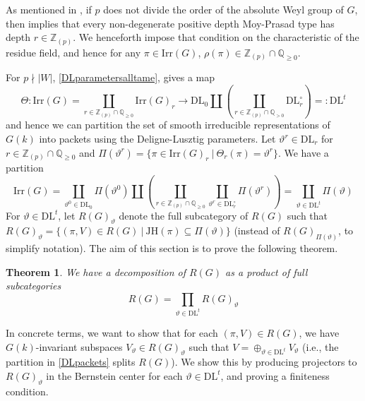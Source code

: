 \documentclass[11 pt]{article}
\numberwithin{equation}{subsection}
\newtheorem{theorem}{Theorem}[section]
\theoremstyle{definition}
\theoremstyle{remark}
\theoremstyle{conjecture}
\newcommand{\Irr}{\mathrm{Irr}}
\newcommand{\DL}{\mathrm{DL}}
\newcommand{\JH}{\mathrm{JH}}
\newcommand{\Z}{\mathbb Z}
\newcommand{\Q}{\mathbb Q}
\begin{document}
As mentioned in \cite[Remark 30]{chendebackertsai}, if $p$ does not divide the order of the absolute Weyl group of $G$, then \cite[Theorem 6.1]{fintzen2021types} implies that every non-degenerate positive depth Moy-Prasad type has depth $r \in \Z_{(p)}$. We henceforth impose that condition on the characteristic of the residue field, and hence for any $\pi \in \Irr(G)$, $\rho(\pi)\in \Z_{(p)}\cap \Q_{\geq 0}$. \par
For $p \nmid |W|$, \eqref{DLparametersalltame}, gives a map 
\begin{equation}\label{DL^tdefinition}
  \Theta:\Irr(G)=\coprod_{r \in \Z_{(p)}\cap \Q_{\geq 0}} \Irr(G)_r \longrightarrow \DL_0\coprod \left(\coprod_{r \in \Z_{(p)}\cap \Q_{> 0}}\mathrm{DL}_r^\circ\right)  =:\DL^t
\end{equation}
and hence we can partition the set of smooth irreducible representations of $G(k)$ into packets using the Deligne-Lusztig parameters. Let $\vartheta^r \in \DL_r$ for $ r \in \Z_{(p)}\cap \Q_{\geq 0}$ and $\Pi(\vartheta^r)= \{\pi \in \Irr(G)_r\:|\: \Theta_r(\pi)= \vartheta^r\}$. We have a partition  
\begin{equation}\label{DLpackets}
    \Irr(G) =\coprod_{\vartheta^0\in \DL_0}\Pi(\vartheta^0)\coprod \left( \coprod_{r \in \Z_{(p)}\cap \Q_{\geq 0} } \coprod_{\vartheta^r\in \DL^\circ_r} \Pi(\vartheta^r)\right)= \coprod_{\vartheta \in \DL^t}\Pi(\vartheta)
\end{equation}
For $\vartheta \in \DL^t$, let $R(G)_\vartheta$ denote the full subcategory of $R(G)$ such that $R(G)_\vartheta=\{ (\pi,V)\in R(G)\:|\: \JH(\pi)\subseteq \Pi(\vartheta)\}$ (instead of $R(G)_{\Pi(\vartheta)}$, to simplify notation). The aim of this section is to prove the following theorem.
\begin{theorem}\label{thm:decompositionDLpackets}
    We have a decomposition of $R(G)$ as a product of full subcategories 
    \begin{equation*}
        R(G) = \prod_{\vartheta\in \DL^t}R(G)_\vartheta
    \end{equation*}
\end{theorem}
In concrete terms, we want to show that for each $(\pi, V)\in R(G)$, we have $G(k)$-invariant subspaces $V_\vartheta \in R(G)_\vartheta$ such that $V = \oplus_{\vartheta \in \DL^t}V_\vartheta$ (i.e., the partition in \eqref{DLpackets} splits $R(G)$). We show this by producing projectors to $R(G)_\vartheta$ in the Bernstein center for each $\vartheta \in \DL^t$, and proving a finiteness condition. \paragraph{}
\end{document}

